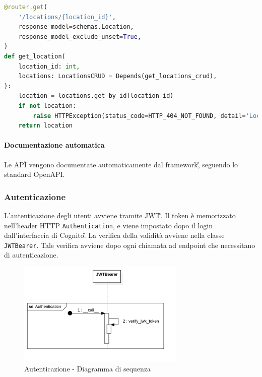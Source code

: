\begin{lstlisting}[language=Python, caption=Esempio di gestione di un \textit{endpoint}]
@router.get(
    '/locations/{location_id}',
    response_model=schemas.Location,
    response_model_exclude_unset=True,
)
def get_location(
    location_id: int,
    locations: LocationsCRUD = Depends(get_locations_crud),
):
    location = locations.get_by_id(location_id)
    if not location:
        raise HTTPException(status_code=HTTP_404_NOT_FOUND, detail='Location not found')
    return location
\end{lstlisting}

\paragraph{Documentazione automatica}\aCapo
Le API\G{} vengono documentate automaticamente dal framework\G, seguendo lo standard OpenAPI.

\subsubsection{Autenticazione}
L'autenticazione degli utenti avviene tramite JWT\G{}. Il token è memorizzato nell'header HTTP \verb|Authentication|,
e viene impostato dopo il login dall'interfaccia di Cognito\G. La verifica della validità avviene nella classe \verb|JWTBearer|.
Tale verifica avviene dopo ogni chiamata ad endpoint che necessitano di autenticazione.
\begin{figure}[H]
    \includegraphics[width=8cm]{sezioni/images/sd_api_auth.png}
    \centering
    \caption{Autenticazione - Diagramma di sequenza}
\end{figure}
